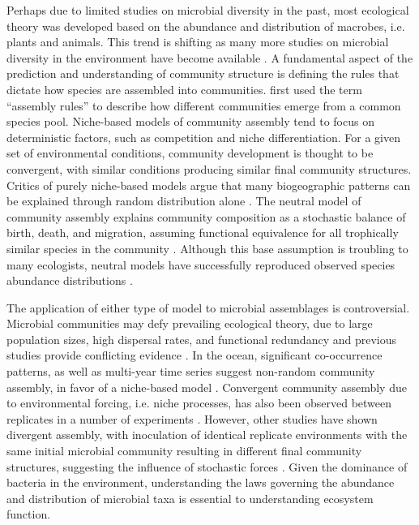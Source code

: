 Perhaps due to limited studies on microbial diversity in the past, most ecological theory was developed based on the abundance and distribution of macrobes, i.e. plants and animals. This trend is shifting as many more studies on microbial diversity in the environment have become available \citep{Barberan2014-pw}. A fundamental aspect of the prediction and understanding of community structure is defining the rules that dictate how species are assembled into communities. \citet{Diamond1975-gh} first used the term ``assembly rules'' to describe how different communities emerge from a common species pool. Niche-based models of community assembly tend to focus on deterministic factors, such as competition and niche differentiation. For a given set of environmental conditions, community development is thought to be convergent, with similar conditions producing similar final community structures. Critics of purely niche-based models argue that many biogeographic patterns can be explained through random distribution alone \citep{Connor1979-go}. The neutral model of community assembly explains community composition as a stochastic balance of birth, death, and migration, assuming functional equivalence for all trophically similar species in the community \citep{hubbell2001unified}. Although this base assumption is troubling to many ecologists, neutral models have successfully reproduced observed species abundance distributions \citep{Enquist2002-fq,Hubbell2006-kd}.
 
The application of either type of model to microbial assemblages is controversial. Microbial communities may defy prevailing ecological theory, due to large population sizes, high dispersal rates, and functional redundancy and previous studies provide conflicting evidence \citep{Fenchel2004-ek}. In the ocean, significant co-occurrence patterns, as well as multi-year time series suggest non-random community assembly, in favor of a niche-based model \citep{fuhrman2006annually,Gilbert2012-ta,El-Swais2015-yx,Eiler2011-jl}. Convergent community assembly due to environmental forcing, i.e. niche processes, has also been observed between replicates in a number of experiments \citep{Kurtz1998-kl,Ayarza2010-gc,Lazzaro2011-ze}. However, other studies have shown divergent assembly, with inoculation of identical replicate environments with the same initial microbial community resulting in different final community structures, suggesting the influence of stochastic forces \citep{pagaling2014community,langenheder2006structure,Roeselers2006-tp}. Given the dominance of bacteria in the environment, understanding the laws governing the abundance and distribution of microbial taxa is essential to understanding ecosystem function.
 

